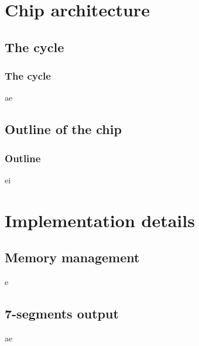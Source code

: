 \documentclass[slidestop]{beamer}
\begin{document}
\section{Chip architecture}
\subsection{The cycle}

\begin{frame}
    \frametitle{The cycle}
ae
\end{frame}

\subsection{Outline of the chip}
\begin{frame}
    \frametitle{Outline}
ei
\end{frame}

\section{Implementation details}

\subsection{Memory management}

\begin{frame}
e
\end{frame}

\subsection{7-segments output}

\begin{frame}
ae
\end{frame}
\end{document}
